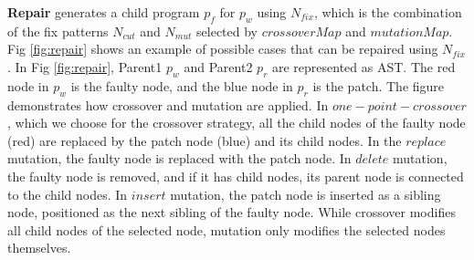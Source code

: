 \documentclass[10pt,conference]{IEEEtran}
\begin{document}
        \textbf{Repair}\label{fixer} generates a child program $p_{f}$ for $p_{w}$ using $N_{fix}$, which is the combination of the fix patterns $N_{cut}$ and $N_{mut}$ selected by $crossoverMap$ and $mutationMap$. Fig \ref{fig:repair} shows an example of possible cases that can be repaired using $N_{fix}$. In Fig \ref{fig:repair}, Parent1 $p_{w}$ and Parent2 $p_{r}$ are represented as AST. The red node in $p_{w}$ is the faulty node, and the blue node in $p_{r}$ is the patch. The figure demonstrates how crossover and mutation are applied. In $one-point-crossover$, which we choose for the crossover strategy, all the child nodes of the faulty node (red) are replaced by the patch node (blue) and its child nodes. In the $replace$ mutation, the faulty node is replaced with the patch node. In $delete$ mutation, the faulty node is removed, and if it has child nodes, its parent node is connected to the child nodes. In $insert$ mutation, the patch node is inserted as a sibling node, positioned as the next sibling of the faulty node. While crossover modifies all child nodes of the selected node, mutation only modifies the selected nodes themselves.
\end{document}
